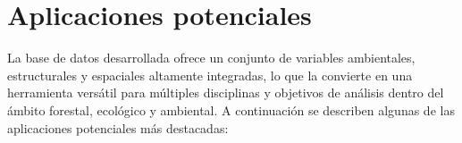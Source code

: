 \section{Aplicaciones potenciales}



La base de datos desarrollada ofrece un conjunto de variables ambientales, estructurales y espaciales altamente integradas, lo que la convierte en una herramienta versátil para múltiples disciplinas y objetivos de análisis dentro del ámbito forestal, ecológico y ambiental. A continuación se describen algunas de las aplicaciones potenciales más destacadas:

